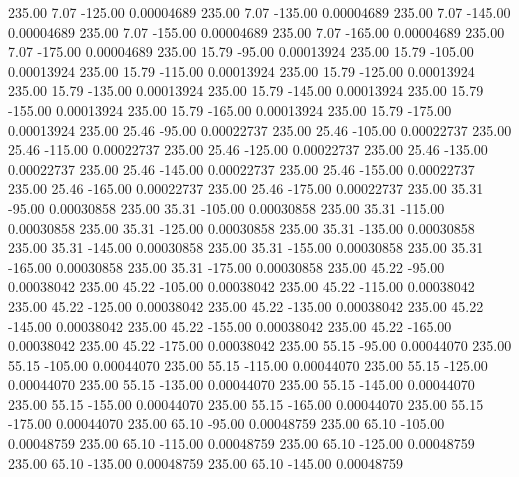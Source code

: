     235.00      7.07   -125.00     0.00004689
    235.00      7.07   -135.00     0.00004689
    235.00      7.07   -145.00     0.00004689
    235.00      7.07   -155.00     0.00004689
    235.00      7.07   -165.00     0.00004689
    235.00      7.07   -175.00     0.00004689
    235.00     15.79    -95.00     0.00013924
    235.00     15.79   -105.00     0.00013924
    235.00     15.79   -115.00     0.00013924
    235.00     15.79   -125.00     0.00013924
    235.00     15.79   -135.00     0.00013924
    235.00     15.79   -145.00     0.00013924
    235.00     15.79   -155.00     0.00013924
    235.00     15.79   -165.00     0.00013924
    235.00     15.79   -175.00     0.00013924
    235.00     25.46    -95.00     0.00022737
    235.00     25.46   -105.00     0.00022737
    235.00     25.46   -115.00     0.00022737
    235.00     25.46   -125.00     0.00022737
    235.00     25.46   -135.00     0.00022737
    235.00     25.46   -145.00     0.00022737
    235.00     25.46   -155.00     0.00022737
    235.00     25.46   -165.00     0.00022737
    235.00     25.46   -175.00     0.00022737
    235.00     35.31    -95.00     0.00030858
    235.00     35.31   -105.00     0.00030858
    235.00     35.31   -115.00     0.00030858
    235.00     35.31   -125.00     0.00030858
    235.00     35.31   -135.00     0.00030858
    235.00     35.31   -145.00     0.00030858
    235.00     35.31   -155.00     0.00030858
    235.00     35.31   -165.00     0.00030858
    235.00     35.31   -175.00     0.00030858
    235.00     45.22    -95.00     0.00038042
    235.00     45.22   -105.00     0.00038042
    235.00     45.22   -115.00     0.00038042
    235.00     45.22   -125.00     0.00038042
    235.00     45.22   -135.00     0.00038042
    235.00     45.22   -145.00     0.00038042
    235.00     45.22   -155.00     0.00038042
    235.00     45.22   -165.00     0.00038042
    235.00     45.22   -175.00     0.00038042
    235.00     55.15    -95.00     0.00044070
    235.00     55.15   -105.00     0.00044070
    235.00     55.15   -115.00     0.00044070
    235.00     55.15   -125.00     0.00044070
    235.00     55.15   -135.00     0.00044070
    235.00     55.15   -145.00     0.00044070
    235.00     55.15   -155.00     0.00044070
    235.00     55.15   -165.00     0.00044070
    235.00     55.15   -175.00     0.00044070
    235.00     65.10    -95.00     0.00048759
    235.00     65.10   -105.00     0.00048759
    235.00     65.10   -115.00     0.00048759
    235.00     65.10   -125.00     0.00048759
    235.00     65.10   -135.00     0.00048759
    235.00     65.10   -145.00     0.00048759
